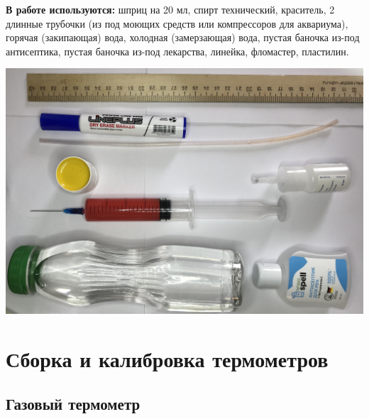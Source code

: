 \textbf{В работе используются:} шприц на 20 мл, спирт технический, краситель, 2 длинные трубочки (из под моющих средств или компрессоров для аквариума), горячая (закипающая) вода, холодная (замерзающая) вода, пустая баночка из-под антисептика, пустая баночка из-под лекарства, линейка, фломастер, пластилин.  \\

\begin{center}
\includegraphics[width=0.9
\linewidth]{4.jpg}\\
\end{center}


\section{Сборка и калибровка термометров}

\subsection{Газовый термометр}

